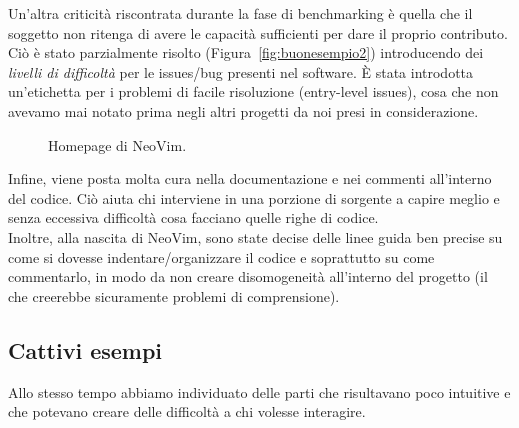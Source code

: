 \documentclass[12pt]{article} %
\begin{document}
Un'altra criticit\`a riscontrata durante la fase di benchmarking \`e quella che il soggetto non ritenga di avere le capacit\`a sufficienti per dare il proprio contributo.\\
Ci\`o \`e stato parzialmente risolto (Figura~\ref{fig:buonesempio2}) introducendo dei \emph{livelli di difficolt\`a} per le issues/bug presenti nel software. \`E stata introdotta un'etichetta per i problemi di facile risoluzione (entry-level issues), cosa che non avevamo mai notato prima negli altri progetti da noi presi in considerazione.

\begin{figure}[H]
\caption{Homepage di NeoVim.}
\label{fig:buonesempio3}
\end{figure}

Infine, viene posta molta cura nella documentazione e nei commenti all'interno del codice. Ci\`o aiuta chi interviene in una porzione di sorgente a capire meglio e senza eccessiva difficolt\`a cosa facciano quelle righe di codice.\\
Inoltre, alla nascita di NeoVim, sono state decise delle linee guida ben precise su come si dovesse indentare/organizzare il codice e soprattutto su come commentarlo, in modo da non creare disomogeneit\`a all'interno del progetto (il che creerebbe sicuramente problemi di comprensione).\\

\subsection{Cattivi esempi}
\label{badexamples}
Allo stesso tempo abbiamo individuato delle parti che risultavano poco intuitive e che potevano creare delle difficolt\`a a chi volesse interagire.
\end{document}

